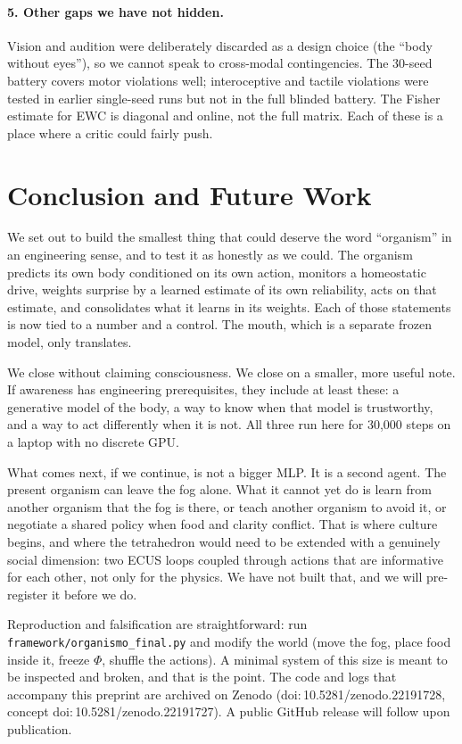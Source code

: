 \documentclass[11pt,a4paper]{article}
\begin{document}
\paragraph{5. Other gaps we have not hidden.} Vision and audition were deliberately discarded as a design choice (the ``body without eyes''), so we cannot speak to cross-modal contingencies. The 30-seed battery covers motor violations well; interoceptive and tactile violations were tested in earlier single-seed runs but not in the full blinded battery. The Fisher estimate for EWC is diagonal and online, not the full matrix. Each of these is a place where a critic could fairly push.

\section{Conclusion and Future Work}

We set out to build the smallest thing that could deserve the word ``organism'' in an engineering sense, and to test it as honestly as we could. The organism predicts its own body conditioned on its own action, monitors a homeostatic drive, weights surprise by a learned estimate of its own reliability, acts on that estimate, and consolidates what it learns in its weights. Each of those statements is now tied to a number and a control. The mouth, which is a separate frozen model, only translates.

We close without claiming consciousness. We close on a smaller, more useful note. If awareness has engineering prerequisites, they include at least these: a generative model of the body, a way to know when that model is trustworthy, and a way to act differently when it is not. All three run here for 30,000 steps on a laptop with no discrete GPU.

What comes next, if we continue, is not a bigger MLP. It is a second agent. The present organism can leave the fog alone. What it cannot yet do is learn from another organism that the fog is there, or teach another organism to avoid it, or negotiate a shared policy when food and clarity conflict. That is where culture begins, and where the tetrahedron would need to be extended with a genuinely social dimension: two ECUS loops coupled through actions that are informative for each other, not only for the physics. We have not built that, and we will pre-register it before we do.

Reproduction and falsification are straightforward: run \texttt{framework/organismo\_final.py} and modify the world (move the fog, place food inside it, freeze $\Phi$, shuffle the actions). A minimal system of this size is meant to be inspected and broken, and that is the point. The code and logs that accompany this preprint are archived on Zenodo (doi:\,10.5281/zenodo.22191728, concept doi:\,10.5281/zenodo.22191727). A public GitHub release will follow upon publication.
\end{document}
